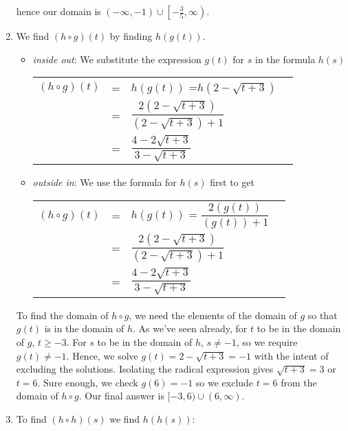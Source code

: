\documentclass{ximera}
\begin{document}
\begin{example}
\begin{enumerate}
\begin{center}
\end{center}

hence our  domain is $(-\infty, -1) \cup \left[-\frac{3}{5}, \infty\right)$.

\item  We find $(h \circ g)(t)$ by finding $h(g(t))$.

\begin{itemize}

\item  \textit{inside out}: We substitute the expression $g(t)$  for $s$ in the formula $h(s)$
\begin{longtable}{rclr} $(h \circ g)(t)$ & = & $h(g(t))$ =$h\left(2-\sqrt{t+3}\right)$ & \\ [2pt]
 & = & $\dfrac{2 \left(2-\sqrt{t+3} \right)}{\left(2-\sqrt{t+3}\right)+1}$ & \\[12pt] 
 & = & $\dfrac{4-2\sqrt{t+3}}{3-\sqrt{t+3}}$ & \\
  \end{longtable}

\item  \textit{outside in}:  We use the formula for $h(s)$ first to get
\begin{longtable}{rclr} $(h \circ g)(t)$ & = & $h(g(t))$ = $\dfrac{2 \left(g(t)\right)}{\left( g(t)\right) + 1}$ & \\ [12pt]
 & = & $\dfrac{2 \left(2-\sqrt{t+3} \right)}{\left(2-\sqrt{t+3}\right)+1}$ & \\[12pt] 
 & = & $\dfrac{4-2\sqrt{t+3}}{3-\sqrt{t+3}}$ & \\
  \end{longtable}
 
 \end{itemize}

To find the domain of $h \circ g$, we need the elements of the domain of $g$ so that $g(t)$ is in the domain of $h$.  As we've seen already, for $t$ to be in the domain of $g$, $t \geq -3$. For $s$ to be in the domain of $h$, $s \neq -1$, so we require $g(t) \neq -1$.  Hence, we solve $g(t) = 2-\sqrt{t+3} = -1$ with the intent of excluding the solutions. Isolating the radical expression gives $\sqrt{t+3} = 3$ or $t = 6$.  Sure enough, we check $g(6)=-1$ so we exclude $t=6$ from the domain of $h \circ g$.  Our final answer is $[-3, 6) \cup (6, \infty)$.


\item  To find $(h \circ h)(s)$ we find $h(h(s))$:

\begin{itemize}


\end{itemize}
\end{enumerate}
\end{example}
\end{document}
